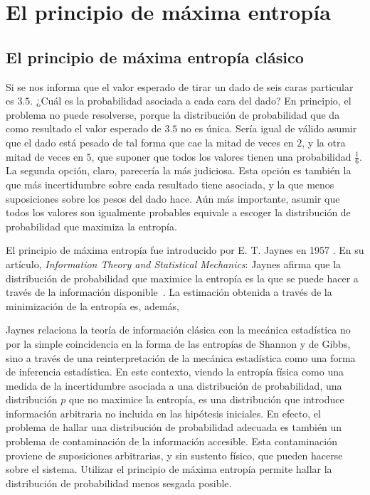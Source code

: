 \section{El principio de máxima entropía}\label{sec:CH1MaxEnt}



\subsection{El principio de máxima entropía clásico}

Si se nos informa que el valor esperado de tirar un dado de seis caras particular es $3.5$. ¿Cuál es la probabilidad asociada a cada cara del dado? En principio, el problema no puede resolverse, porque la distribución de probabilidad que da como resultado el valor esperado de $3.5$ no es única. Sería igual de válido asumir que el dado está pesado de tal forma que cae la mitad de veces en $2$, y la otra mitad de veces en $5$, que suponer que todos los valores tienen una probabilidad $\frac{1}{6}$. La segunda opción, claro, parecería la más judiciosa. Esta opción es también la que más incertidumbre sobre cada resultado tiene asociada, y la que menos suposiciones sobre los pesos del dado hace. Aún más importante, asumir que todos los valores son igualmente probables equivale a escoger la distribución de probabilidad que maximiza la entropía.

El principio de máxima entropía fue introducido por E. T. Jaynes en 1957 \ddnote{[cita]}. En su artículo, \textit{Information Theory and Statistical Mechanics}: Jaynes afirma que la distribución de probabilidad que maximice la entropía es la  que se puede hacer a través de la información disponible~\cite{JaynesI}. La estimación obtenida a través de la minimización de la entropía es, además, 

Jaynes relaciona la teoría de información clásica con la mecánica estadística no por la simple coincidencia en la forma de las entropías de Shannon y de Gibbs, sino a través de una reinterpretación de la mecánica estadística como una forma de inferencia estadística. En este contexto, viendo la entropía física como una medida de la incertidumbre asociada a una distribución de probabilidad, una distribución $p$ que no maximice la entropía, es una distribución que introduce información arbitraria no incluida en las hipótesis iniciales. En efecto, el problema de hallar una distribución de probabilidad adecuada es también un problema de contaminación de la información accesible. Esta contaminación proviene de suposiciones arbitrarias, y sin sustento físico, que pueden hacerse sobre el sistema. Utilizar el principio de máxima entropía permite hallar la distribución de probabilidad menos sesgada posible.

